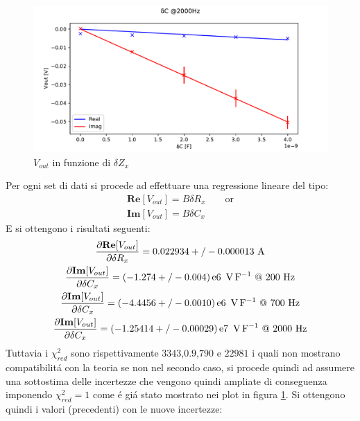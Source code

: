 \begin{figure}[h]
\begin{minipage}{0.5\textwidth}
    \end{minipage}\hfill
    \begin{minipage}{0.5\textwidth}
        \centering
        \includegraphics[width=\textwidth]{Figure_11.pdf} 
    \end{minipage}
    \caption{$V_{out}$ in funzione di $\delta Z_x$}
    \label{fig:deltaz}
\end{figure}
Per ogni set di dati si procede ad effettuare una regressione lineare del tipo:
\begin{gather}
	\mathbf{Re}[V_{out}]=B \delta R_x \qquad \text{or}\\
	\mathbf{Im}[V_{out}]=B \delta C_x
\end{gather}
E si ottengono i risultati seguenti:
\begin{gather}
	\frac{\partial \mathbf{Re}[V_{out}]}{\partial \delta R_x} = 0.022934+/-0.000013 \ \si{\ampere} \\
	\frac{\partial \mathbf{Im}[V_{out}]}{\partial \delta C_x} = (-1.274+/-0.004)\E{6} \ \si{\volt\per\farad} \ @ \  200 \ \si{\hertz}\\
	\frac{\partial \mathbf{Im}[V_{out}]}{\partial \delta C_x} = (-4.4456+/-0.0010)\E{6} \ \si{\volt\per\farad} \ @ \  700 \ \si{\hertz}\\
	\frac{\partial \mathbf{Im}[V_{out}]}{\partial \delta C_x} = (-1.25414+/-0.00029)\E{7} \ \si{\volt\per\farad} \ @ \  2000 \ \si{\hertz}
\end{gather}
Tuttavia i $\chi^2_{red}$ sono rispettivamente $3343$,$0.9$,$790$ e $22981$ i quali non mostrano compatibilit\'a con la teoria se non nel secondo caso, si procede quindi ad assumere una sottostima delle incertezze che vengono quindi ampliate di conseguenza imponendo $\chi^2_{red}=1$ come \'e gi\'a stato mostrato nei plot in figura \ref{fig:deltaz}. Si ottengono quindi i valori (precedenti) con le nuove incertezze:

